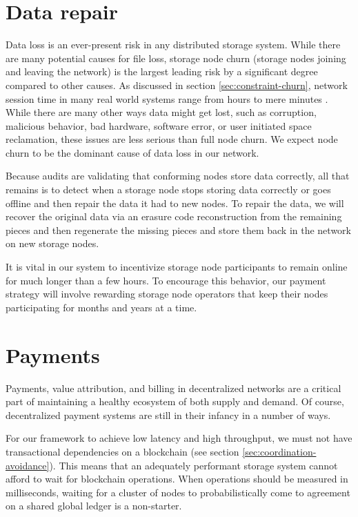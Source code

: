 \documentclass[8pt,fleqn,openany]{book}
\begin{document}
\section{Data repair}

Data loss is an ever-present risk in any distributed storage system. While there
are many potential causes for file loss, storage node churn (storage
nodes joining and leaving the network) is the largest leading risk by a
significant degree compared to other causes.
As discussed in section \ref{sec:constraint-churn}, network session time in
many real world systems range from hours to mere minutes \cite{dht-churn}.
While there are many other ways data might get lost, such as corruption,
malicious behavior, bad hardware, software error, or user initiated space
reclamation, these issues are less serious than full node churn. We expect
node churn to be the dominant cause of data loss in our network.

Because audits are validating that conforming nodes store data correctly, all
that remains is to detect when a storage node stops storing
data correctly or goes offline and then repair the data it had to new nodes.
To repair the data, we will recover the original data via an erasure code
reconstruction from the remaining pieces and then regenerate the missing
pieces and store them back in the network on new storage nodes.

It is vital in our system to incentivize storage node participants to remain
online for much longer than a few hours. To encourage this behavior,
our payment strategy will involve rewarding storage node
operators that keep their nodes participating for months and years at a time.

\section{Payments}

Payments, value attribution, and billing in decentralized networks are a
critical part of maintaining a healthy
ecosystem of both supply and demand. Of course, decentralized payment systems
are still in their infancy in a number of ways.

For our framework to achieve low latency and high throughput, we must not have
transactional dependencies on a blockchain (see section \ref{sec:coordination-avoidance}).
This means that an adequately performant storage system cannot afford to
wait for blockchain operations. When operations should be measured in
milliseconds, waiting for a cluster of nodes to probabilistically come to
agreement on a shared global ledger is a non-starter.
\end{document}
